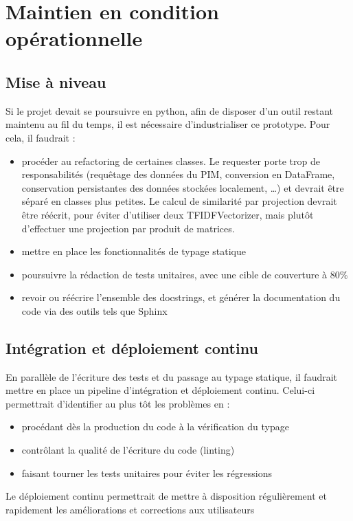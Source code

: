         \section{Maintien en condition opérationnelle}

            \subsection{Mise à niveau}
            
            Si le projet devait se poursuivre en python, afin de disposer d'un outil restant maintenu au fil du temps, il est nécessaire d'industrialiser ce prototype.
            Pour cela, il faudrait : 
            \begin{itemize}
                \item procéder au refactoring de certaines classes. Le requester porte trop de responsabilités (requêtage des données du PIM, conversion en DataFrame, conservation persistantes des données stockées localement, \dots) et devrait être séparé en classes plus petites. Le calcul de similarité par projection devrait être réécrit, pour éviter d'utiliser deux TFIDFVectorizer, mais plutôt d'effectuer une projection par produit de matrices.
                \item mettre en place les fonctionnalités de typage statique
                \item poursuivre la rédaction de tests unitaires, avec une cible de couverture à 80\%
                \item revoir ou réécrire l'ensemble des docstrings, et générer la documentation du code via des outils tels que Sphinx
            \end{itemize}

            \subsection{Intégration et déploiement continu}

            En parallèle de l'écriture des tests et du passage au typage statique, il faudrait mettre en place un pipeline d'intégration et déploiement continu.
            Celui-ci permettrait d'identifier au plus tôt les problèmes en :
            \begin{itemize}
                \item procédant dès la production du code à la vérification du typage
                \item contrôlant la qualité de l'écriture du code (linting)
                \item faisant tourner les tests unitaires pour éviter les régressions
            \end{itemize}
            Le déploiement continu permettrait de mettre à disposition régulièrement et rapidement les améliorations et corrections aux utilisateurs


